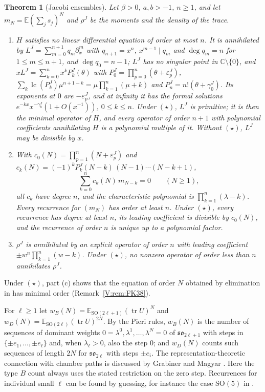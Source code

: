 \documentclass[11pt,a4paper]{article}
\newtheorem{theorem}{Theorem}[section]
\theoremstyle{definition}
\theoremstyle{remark}
\newcommand{\C}{\mathbb C}
\newcommand{\E}{\mathbb E}
\DeclareMathOperator{\lc}{lc}
\DeclareMathOperator{\tr}{tr}
\numberwithin{equation}{section}
\begin{document}
\begin{theorem}[Jacobi ensembles]\label{V:thm:C}
Let $\beta>0$, $a,b>-1$, $n\ge1$, and let $m_N=\E(\sum_js_j)^N$ and $\rho^J$ be the moments and the density of the trace.
\begin{enumerate}
\item[(a)] $H$ satisfies no linear differential equation of order at most $n$. It is annihilated by $L^J=\sum_{m=0}^{n+1}q_m\partial_x^m$ with $q_{n+1}=x^n$, $x^{m-1}\mid q_m$ and $\deg q_m=n$ for $1\le m\le n+1$, and $\deg q_0=n-1$; $L^J$ has no singular point in $\C\setminus\{0\}$, and $xL^J=\sum_{k=0}^{n}x^kP^J_k(\theta)$ with $P^J_0=\prod_{p=0}^n(\theta+\varepsilon^J_p)$, $\sum_k\lc(P^J_k)\mu^{n+1-k}=\mu\prod_{k=1}^n(\mu+k)$ and $P^J_n=n!(\theta+\gamma^J_0)$. Its exponents at $0$ are $-\varepsilon^J_p$, and at infinity it has the formal solutions $e^{-kx}x^{-\gamma^J_k}(1+O(x^{-1}))$, $0\le k\le n$. Under $(\star)$, $L^J$ is primitive; it is then the minimal operator of $H$, and every operator of order $n+1$ with polynomial coefficients annihilating $H$ is a polynomial multiple of it. Without $(\star)$, $L^J$ may be divisible by $x$.
\item[(b)] With $c_0(N)=\prod_{p=1}^n(N+\varepsilon^J_p)$ and $c_k(N)=(-1)^kP^J_k(N-k)\,(N-1)\cdots(N-k+1)$,
\[
\sum_{k=0}^{n}c_k(N)\,m_{N-k}=0\qquad(N\ge1),
\]
all $c_k$ have degree $n$, and the characteristic polynomial is $\prod_{k=1}^n(\lambda-k)$. Every recurrence for $(m_N)$ has order at least $n$. Under $(\star)$, every recurrence has degree at least $n$, its leading coefficient is divisible by $c_0(N)$, and the recurrence of order $n$ is unique up to a polynomial factor.
\item[(c)] $\rho^J$ is annihilated by an explicit operator of order $n$ with leading coefficient $\pm w^n\prod_{k=1}^n(w-k)$. Under $(\star)$, no nonzero operator of order less than $n$ annihilates $\rho^J$.
\end{enumerate}
\end{theorem}

Under $(\star)$, part (c) shows that the equation of order $N$ obtained by elimination in \cite[Remark~3.8]{FK22} has minimal order (Remark~\ref{V:rem:FK38}).

For $\ell\ge1$ let $w_B(N)=\E_{\mathrm{SO}(2\ell+1)}(\tr U)^N$ and $w_D(N)=\E_{\mathrm{SO}(2\ell)}(\tr U)^{2N}$. By the Pieri rules, $w_B(N)$ is the number of sequences of dominant weights $0=\lambda^0,\lambda^1,\dots,\lambda^N=0$ of $\mathfrak{so}_{2\ell+1}$ with steps in $\{\pm e_1,\dots,\pm e_\ell\}$ and, when $\lambda_\ell>0$, also the step $0$; and $w_D(N)$ counts such sequences of length $2N$ for $\mathfrak{so}_{2\ell}$ with steps $\pm e_i$. The representation-theoretic connection with chamber paths is discussed by Grabiner and Magyar \cite{GM93}. Here the type $B$ count always uses the stated restriction on the zero step. Recurrences for individual small $\ell$ can be found by guessing, for instance the case $\mathrm{SO}(5)$ in \cite[A095922]{OEIS}.
\end{document}
